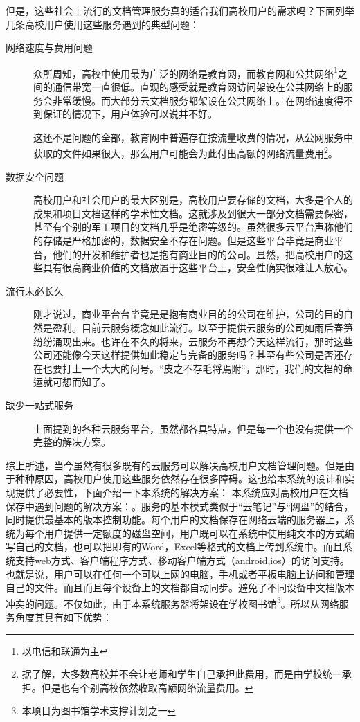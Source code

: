 但是，这些社会上流行的文档管理服务真的适合我们高校用户的需求吗？下面列举几条高校用户使用这些服务遇到的典型问题：
\begin{description}
\item[网络速度与费用问题] 众所周知，高校中使用最为广泛的网络是教育网，而教育网和公共网络\footnote{以电信和联通为主}之间的通信带宽一直很低。直观的感受就是教育网访问架设在公共网络上的服务会非常缓慢。而大部分云文档服务都架设在公共网络上。在网络速度得不到保证的情况下，用户体验可以说并不好。

  这还不是问题的全部，教育网中普遍存在按流量收费的情况，从公网服务中获取的文件如果很大，那么用户可能会为此付出高额的网络流量费用\footnote{据了解，大多数高校并不会让老师和学生自己承担此费用，而是由学校统一承担。但是也有个别高校依然收取高额网络流量费用。}。
\item[数据安全问题] 高校用户和社会用户的最大区别是，高校用户要存储的文档，大多是个人的成果和项目文档这样的学术性文档。这就涉及到很大一部分文档需要保密，甚至有个别的军工项目的文档几乎是绝密等级的。虽然很多云平台声称他们的存储是严格加密的，数据安全不存在问题。但是这些平台毕竟是商业平台，他们的开发和维护者也是抱有商业目的的公司。显然，把高校用户的这些具有很高商业价值的文档放置于这些平台上，安全性确实很难让人放心。
\item[流行未必长久] 刚才说过，商业平台台毕竟是是抱有商业目的的公司在维护，公司的目的自然是盈利。目前云服务概念如此流行。以至于提供云服务的公司如雨后春笋纷纷涌现出来。也许在不久的将来，云服务不再想今天这样流行，那时这些公司还能像今天这样提供如此稳定与完备的服务吗？甚至有些公司是否还存在也要打上一个大大的问号。“皮之不存毛将焉附“，那时，我们的文档的命运就可想而知了。
\item[缺少一站式服务] 上面提到的各种云服务平台，虽然都各具特点，但是每一个也没有提供一个完整的解决方案。
\end{description}
综上所述，当今虽然有很多既有的云服务可以解决高校用户文档管理问题。但是由于种种原因，高校用户使用这些服务依然存在很多障碍。这也给本系统的设计和实现提供了必要性，下面介绍一下本系统的解决方案：
本系统应对高校用户在文档保存中遇到问题的解决方案：。服务的基本模式类似于“云笔记”与“网盘”的结合，同时提供最基本的版本控制功能。每个用户的文档保存在网络云端的服务器上，系统为每个用户提供一定额度的磁盘空间，用户既可以在系统中使用纯文本的方式编写自己的文档，也可以把即有的Word，Excel等格式的文档上传到系统中。而且系统支持web方式、客户端程序方式、移动客户端方式（android,ios）的访问支持。也就是说，用户可以在任何一个可以上网的电脑，手机或者平板电脑上访问和管理自己的文件。而且而且每个设备上的文档都自动同步。避免了不同设备中文档版本冲突的问题。不仅如此，由于本系统服务器将架设在学校图书馆\footnote{本项目为图书馆学术支撑计划之一}。所以从网络服务角度其具有如下优势：
